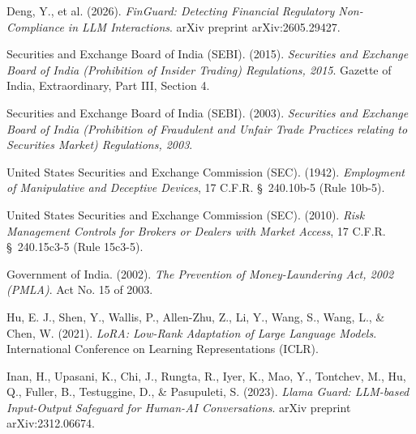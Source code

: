 \documentclass[11pt,a4paper]{article}
\begin{document}
\begin{enumerate}[leftmargin=*,label={[\arabic*]}]
    \item Deng, Y., et al. (2026). \textit{FinGuard: Detecting Financial Regulatory Non-Compliance in LLM Interactions}. arXiv preprint arXiv:2605.29427.
    \item Securities and Exchange Board of India (SEBI). (2015). \textit{Securities and Exchange Board of India (Prohibition of Insider Trading) Regulations, 2015}. Gazette of India, Extraordinary, Part III, Section 4.
    \item Securities and Exchange Board of India (SEBI). (2003). \textit{Securities and Exchange Board of India (Prohibition of Fraudulent and Unfair Trade Practices relating to Securities Market) Regulations, 2003}.
    \item United States Securities and Exchange Commission (SEC). (1942). \textit{Employment of Manipulative and Deceptive Devices}, 17 C.F.R. \S~240.10b-5 (Rule 10b-5).
    \item United States Securities and Exchange Commission (SEC). (2010). \textit{Risk Management Controls for Brokers or Dealers with Market Access}, 17 C.F.R. \S~240.15c3-5 (Rule 15c3-5).
    \item Government of India. (2002). \textit{The Prevention of Money-Laundering Act, 2002 (PMLA)}. Act No. 15 of 2003.
    \item Hu, E. J., Shen, Y., Wallis, P., Allen-Zhu, Z., Li, Y., Wang, S., Wang, L., \& Chen, W. (2021). \textit{LoRA: Low-Rank Adaptation of Large Language Models}. International Conference on Learning Representations (ICLR).
    \item Inan, H., Upasani, K., Chi, J., Rungta, R., Iyer, K., Mao, Y., Tontchev, M., Hu, Q., Fuller, B., Testuggine, D., \& Pasupuleti, S. (2023). \textit{Llama Guard: LLM-based Input-Output Safeguard for Human-AI Conversations}. arXiv preprint arXiv:2312.06674.
\end{enumerate}
\end{document}
